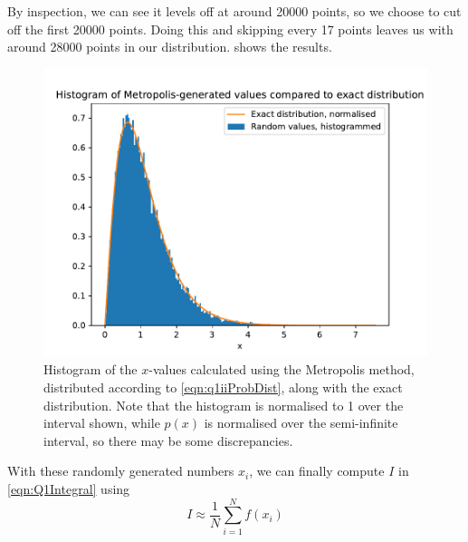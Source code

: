 \documentclass[11pt]{article}
\begin{document}
\begin{enumerate}
\begin{enumerate}
        By inspection, we can see it levels off at around \num[]{20000} points, so we choose to cut off the first \num[]{20000} points. Doing this and skipping every 17 points leaves us with around \num[]{28000} points in our distribution.  shows the results. 
        
        \begin{figure}[h]
            \begin{center}
                \includegraphics[width=.6\textwidth]{Plots/histogram.pdf}
                \caption{Histogram of the $x$-values calculated using the Metropolis method, distributed according to \cref{eqn:q1iiProbDist}, along with the exact distribution. Note that the histogram is normalised to 1 over the interval shown, while $p(x)$ is normalised over the semi-infinite interval, so there may be some discrepancies.}
                \label{fig:histogram}
            \end{center}
        \end{figure}
        
        With these randomly generated numbers $x_i$, we can finally compute $I$ in \cref{eqn:Q1Integral} using
        \begin{equation}
            I \approx \frac{1}{N}\sum_{i=1}^N f(x_i)
            \label{eqn:}
        \end{equation}
        

    \end{enumerate}
    


\end{enumerate}
\end{document}
